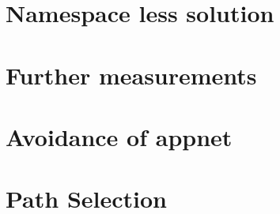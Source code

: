 \section*{Namespace less solution}

\section*{Further measurements}

\section*{Avoidance of appnet}

\section*{Path Selection}

